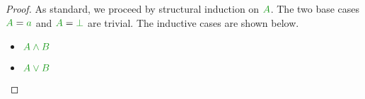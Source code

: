 \begin{proof}
	As standard, we proceed by structural induction on $\fm A$. The two base cases $\fm A=\fm a$ and $\fm A=\fm\bot$ are trivial. The inductive cases are shown below.
	\begin{itemize}
		\item $\fm{A \AND B}$
		\begin{smallequation*}
	\end{smallequation*}
	\item $\fm{A \OR B}$
	\begin{smallequation*}
	\end{smallequation*}
	

\end{itemize}
\end{proof}
